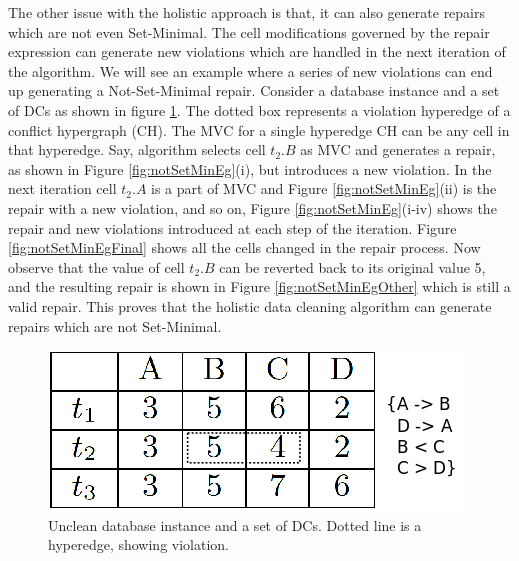 The other issue with the holistic approach is that, it can also generate repairs which are not even Set-Minimal.
The cell modifications governed by the repair expression can generate new violations which are handled in the next iteration of the algorithm.
We will see an example where a series of new violations can end up generating a Not-Set-Minimal repair.
Consider a database instance and a set of DCs as shown in figure \ref{fig:eg4}.
The dotted box represents a violation hyperedge of a conflict hypergraph (CH).
The MVC for a single hyperedge CH can be any cell in that hyperedge.
Say, algorithm selects cell $t_2.B$ as MVC and generates a repair, as shown in Figure \ref{fig:notSetMinEg}(i), but introduces a new violation.
In the next iteration cell $t_2.A$ is a part of MVC and Figure \ref{fig:notSetMinEg}(ii) is the repair with a new violation, and so on, 
Figure \ref{fig:notSetMinEg}(i-iv) shows the repair and new violations introduced at each step of the iteration.
Figure \ref{fig:notSetMinEgFinal} shows all the cells changed in the repair process.
Now observe that the value of cell $t_2.B$ can be reverted back to its original value 5, and the resulting repair is shown in Figure \ref{fig:notSetMinEgOther} which is still a valid repair.
This proves that the holistic data cleaning algorithm can generate repairs which are not Set-Minimal.

\begin{figure}
   \centering
   \includegraphics[scale=0.25]{eg4.png}
   \caption{Unclean database instance and a set of DCs. Dotted line is a hyperedge, showing violation.}
   \label{fig:eg4}
\end{figure}

